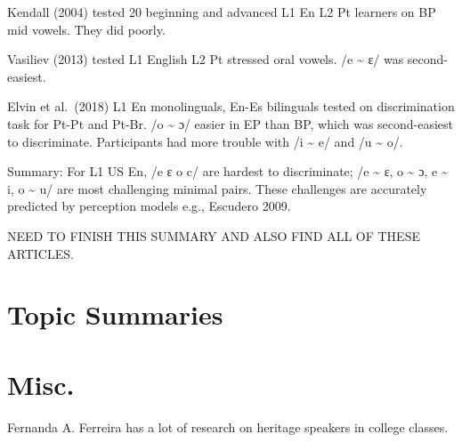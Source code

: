 \documentclass[
  letterpaper,
  DIV=11,
  numbers=noendperiod]{scrartcl}
\begin{document}
Kendall (2004) tested 20 beginning and advanced L1 En L2 Pt learners on
BP mid vowels. They did poorly.

Vasiliev (2013) tested L1 English L2 Pt stressed oral vowels. /e
\textasciitilde{} ɛ/ was second-easiest.

Elvin et al.~(2018) L1 En monolinguals, En-Es bilinguals tested on
discrimination task for Pt-Pt and Pt-Br. /o \textasciitilde{} ɔ/ easier
in EP than BP, which was second-easiest to discriminate. Participants
had more trouble with /i \textasciitilde{} e/ and /u \textasciitilde{}
o/.

Summary: For L1 US En, /e ɛ o c/ are hardest to discriminate; /e
\textasciitilde{} ɛ, o \textasciitilde{} ɔ, e \textasciitilde{} i, o
\textasciitilde{} u/ are most challenging minimal pairs. These
challenges are accurately predicted by perception models e.g., Escudero
2009.

NEED TO FINISH THIS SUMMARY AND ALSO FIND ALL OF THESE ARTICLES.

\section{Topic Summaries}\label{topic-summaries}

\section{Misc.}\label{misc.}

Fernanda A. Ferreira has a lot of research on heritage speakers in
college classes.
\end{document}

